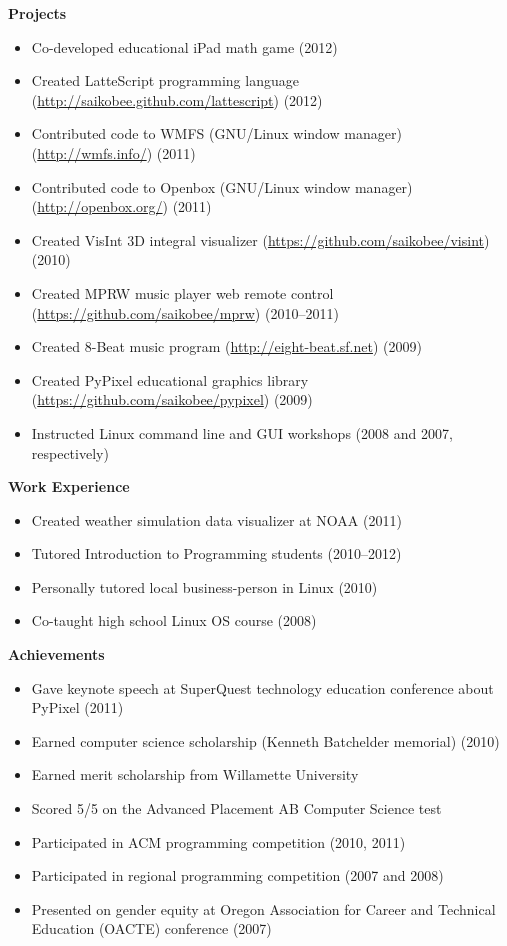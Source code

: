 \documentclass[10pt]{article}
\begin{document}
\medskip
\noindent \textbf{Projects} \hrulefill
\begin{itemize}
\item Co-developed educational iPad math game (2012)
\item Created LatteScript programming language
    (\url{http://saikobee.github.com/lattescript}) (2012)
\item Contributed code to WMFS (GNU/Linux window manager)
    (\url{http://wmfs.info/}) (2011)
\item Contributed code to Openbox (GNU/Linux window manager)
    (\url{http://openbox.org/}) (2011)
\item Created VisInt 3D integral visualizer
    (\url{https://github.com/saikobee/visint}) (2010)
\item Created MPRW music player web remote control
    (\url{https://github.com/saikobee/mprw}) (2010\---2011)
\item Created 8-Beat music program
    (\url{http://eight-beat.sf.net}) (2009)
\item Created PyPixel educational graphics library
    (\url{https://github.com/saikobee/pypixel}) (2009)
\item Instructed Linux command line and GUI workshops (2008 and 2007, respectively)
\end{itemize}

\medskip
\noindent \textbf{Work Experience} \hrulefill
\begin{itemize}
\item Created weather simulation data visualizer at NOAA (2011)
\item Tutored Introduction to Programming students (2010\---2012)
\item Personally tutored local business-person in Linux (2010)
\item Co-taught high school Linux OS course (2008)
\end{itemize}

\medskip
\noindent \textbf{Achievements} \hrulefill
\begin{itemize}
\item Gave keynote speech at SuperQuest technology education conference about
PyPixel (2011)
\item Earned computer science scholarship (Kenneth Batchelder memorial) (2010)
\item Earned merit scholarship from Willamette University
\item Scored 5/5 on the Advanced Placement AB Computer Science test
\item Participated in ACM programming competition (2010, 2011)
\item Participated in regional programming competition (2007 and 2008)
\item Presented on gender equity at Oregon Association for Career and
Technical Education (OACTE) conference (2007)
\end{itemize}
\end{document}
